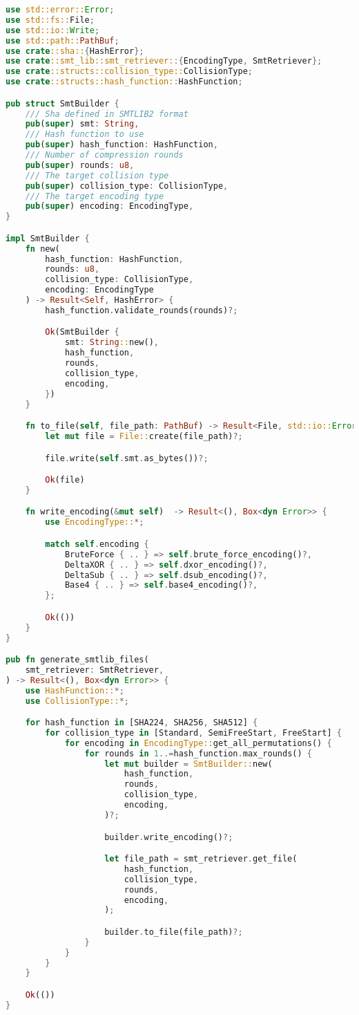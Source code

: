 \begin{lstlisting}[language=rust, caption={smt\_lib/smt\_lib.rs}]
use std::error::Error;
use std::fs::File;
use std::io::Write;
use std::path::PathBuf;
use crate::sha::{HashError};
use crate::smt_lib::smt_retriever::{EncodingType, SmtRetriever};
use crate::structs::collision_type::CollisionType;
use crate::structs::hash_function::HashFunction;

pub struct SmtBuilder {
	/// Sha defined in SMTLIB2 format
	pub(super) smt: String,
	/// Hash function to use
	pub(super) hash_function: HashFunction,
	/// Number of compression rounds
	pub(super) rounds: u8,
	/// The target collision type
	pub(super) collision_type: CollisionType,
	/// The target encoding type
	pub(super) encoding: EncodingType,
}

impl SmtBuilder {
	fn new(
		hash_function: HashFunction,
		rounds: u8,
		collision_type: CollisionType,
		encoding: EncodingType
	) -> Result<Self, HashError> {
		hash_function.validate_rounds(rounds)?;

		Ok(SmtBuilder {
			smt: String::new(),
			hash_function,
			rounds,
			collision_type,
			encoding,
		})
	}

	fn to_file(self, file_path: PathBuf) -> Result<File, std::io::Error> {
		let mut file = File::create(file_path)?;

		file.write(self.smt.as_bytes())?;

		Ok(file)
	}

	fn write_encoding(&mut self)  -> Result<(), Box<dyn Error>> {
		use EncodingType::*;

		match self.encoding {
			BruteForce { .. } => self.brute_force_encoding()?,
			DeltaXOR { .. } => self.dxor_encoding()?,
			DeltaSub { .. } => self.dsub_encoding()?,
			Base4 { .. } => self.base4_encoding()?,
		};

		Ok(())
	}
}

pub fn generate_smtlib_files(
	smt_retriever: SmtRetriever,
) -> Result<(), Box<dyn Error>> {
	use HashFunction::*;
	use CollisionType::*;

	for hash_function in [SHA224, SHA256, SHA512] {
		for collision_type in [Standard, SemiFreeStart, FreeStart] {
			for encoding in EncodingType::get_all_permutations() {
				for rounds in 1..=hash_function.max_rounds() {
					let mut builder = SmtBuilder::new(
						hash_function,
						rounds,
						collision_type,
						encoding,
					)?;

					builder.write_encoding()?;

					let file_path = smt_retriever.get_file(
						hash_function,
						collision_type,
						rounds,
						encoding,
					);

					builder.to_file(file_path)?;
				}
			}
		}
	}

	Ok(())
}
\end{lstlisting}

